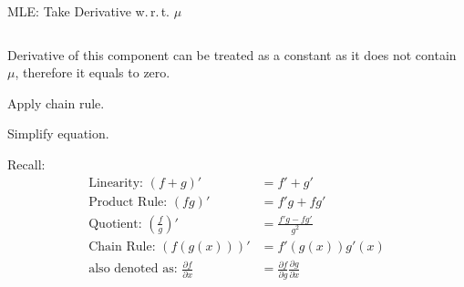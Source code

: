 \begin{frame}{MLE: Take Derivative w.\,r.\,t. $\mu$}
\begin{columns}
\begin{column}{0.5\textwidth}
\begin{enumerate}
				{
				\item Derivative of this component can be treated as a constant as it does not contain $\mu$, therefore it equals to zero.
				\item Apply chain rule.
				\item Simplify equation.
				      }
			\end{enumerate}
			\vspace*{1em}
			{
				\footnotesize
				Recall:
				\vspace*{-1em}
				\begin{align*}
					\text{Linearity: } (f+g)'                                        & = f' + g'                                                                       \\
					\text{Product Rule: } (fg)'                                      & = f'g + fg'                                                                     \\
					\text{Quotient: } \left(\textstyle\frac{f}{g}\right)'            & =\textstyle\frac{f'g-fg'}{g^2}                                                  \\
					\text{Chain Rule: } (f(g(x)))'                                   & =f'(g(x))g'(x)                                                                  \\
					\text{also denoted as: } \textstyle\frac{\partial f}{\partial x} & =\textstyle\frac{\partial f}{\partial g}\textstyle\frac{\partial g}{\partial x}
				\end{align*}
			}
		\end{column}
	\end{columns}
\end{frame}

